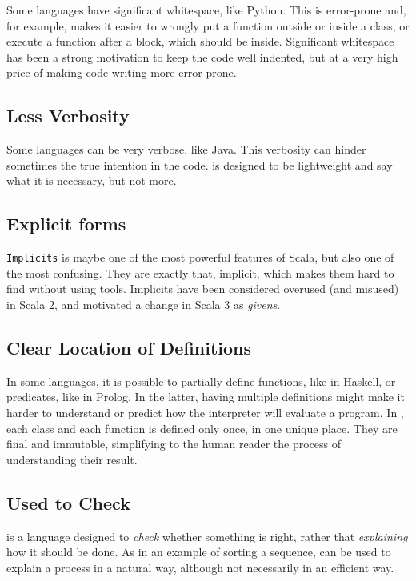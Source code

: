 Some languages have significant whitespace, like Python.
This is error-prone and, for example, makes it easier to wrongly put a function outside or inside a class, or execute a function after a block, which should be inside.
Significant whitespace has been a strong motivation to keep the code well indented, but at a very high price of making code writing more error-prone.

\subsection{Less Verbosity}

Some languages can be very verbose, like Java.
This verbosity can hinder sometimes the true intention in the code.
\Soda is designed to be lightweight and say what it is necessary, but not more.

\subsection{Explicit forms}

\texttt{Implicits} is maybe one of the most powerful features of Scala, but also one of the most confusing.
They are exactly that, implicit, which makes them hard to find without using tools.
Implicits have been considered overused (and misused) in Scala 2, and motivated a change in Scala 3 as \textit{givens}.

\subsection{Clear Location of Definitions}

In some languages, it is possible to partially define functions, like in Haskell, or predicates, like in Prolog.
In the latter, having multiple definitions might make it harder to understand or predict how the interpreter will evaluate a program.
In \Soda, each class and each function is defined only once, in one unique place.
They are final and immutable, simplifying to the human reader the process of understanding their result.

\subsection{Used to Check}

\Soda is a language designed to \textit{check} whether something is right, rather that \textit{explaining} how it should be done.
As in an example of sorting a sequence, \Soda can be used to explain a process in a natural way, although not necessarily in an efficient way.


